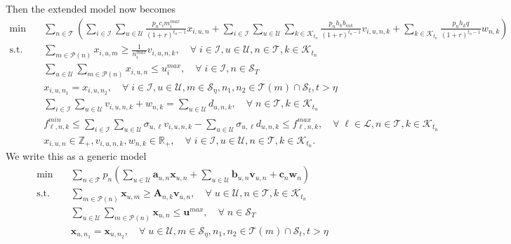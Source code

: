 \documentclass[10pt]{article}
\theoremstyle{plain}
\theoremstyle{definition}
\theoremstyle{remark}
\newcommand{\mb}{\mathbf}
\newcommand{\mcal}{\mathcal}
\newcommand{\bA}{\mathbf{A}}
\newcommand{\ba}{\mathbf{a}}
\newcommand{\bb}{\mathbf{b}}
\newcommand{\bx}{\mathbf{x}}
\newcommand{\cP}{\mathcal{P}}
\newcommand{\cS}{\mcal{S}}
\newcommand{\T}{\mathcal{T}}
\newcommand{\Z}{\mathbb{Z}}
\newcommand{\R}{\mathbb{R}}
\begin{document}
\begin{enumerate}[label=\emph{\roman*)}, topsep=0ex, itemsep=0ex]
Then the extended model now becomes 
\begin{subequations}
\begin{align}
\min \quad & \sum_{n\in \T}\left(\sum_{i\in \mcal{I}}\sum_{u\in \mcal{U}}\frac{p_nc_im_i^{max}}{(1+r)^{t_n-1}}x_{i,u,n}
	+\sum_{i\in \mcal{I}} \sum_{u\in \mcal{U}}\sum_{k\in \mcal{K}_{t_n}}\frac{p_nh_kb_{ink}}{(1+r)^{t_n-1}}v_{i,u,n,k} 
	+ \sum_{k\in \mcal{K}_{t_n}}\frac{p_nh_k q}{(1+r)^{t_n-1}}w_{n,k}\right)\label{ge2:obj}\\
\text{s.t.} \quad & \sum_{m\in \cP(n)}x_{i,u,m} \ge \frac{1}{n_i^{max}}v_{i,u,n,k},
\quad \forall\; i\in \mcal{I}, u\in \mcal{U}, n\in \T, k\in \mcal{K}_{t_n}\label{ge2:capacity}\\
& \sum_{u\in \mcal{U}}\sum_{m\in \cP(n)}x_{i,u,n} \le u_i^{max}, \quad \forall\; i\in \mcal{I}, n\in \cS_T\label{ge2:ub}\\
& x_{i,u,n_1} = x_{i,u,n_2}, \quad \forall\; i\in \mcal{I}, u\in \mcal{U}, m\in \mcal{S}_{\eta}, n_1, n_2\in \T(m)\cap \mcal{S}_t,t>\eta\label{ge2:na}\\
& \sum_{i\in \mcal{I}} \sum_{u\in \mcal{U}}v_{i,u,n,k} + w_{n,k} = \sum_{u\in \mcal{U}}d_{u,n,k}, \quad \forall\; n\in \T, k\in \mcal{K}_{t_n}\label{ge2:demand}\\
& f_{\ell,n,k}^{min} \le \sum_{i\in \mcal{I}}\sum_{u\in \mcal{U}}\sigma_{u,\ell}v_{i,u,n,k} - \sum_{u\in \mcal{U}}\sigma_{u,\ell}d_{u,n,k} \le f_{\ell,n,k}^{max},
\quad \forall\; \ell\in \mcal{L}, n\in \T, k\in \mcal{K}_{t_n}\label{ge2:transmission}\\
& x_{i,u,n}\in \Z_+, v_{i,u,n,k}, w_{n,k}\in \R_+, \quad \forall\; i\in \mcal{I}, u\in \mcal{U}, n\in \T, k\in \mcal{K}_{t_n}.\label{ge2:variable}
\end{align}
\end{subequations}
%
We write this as a generic model
%
\begin{subequations}
\begin{align}
\min \quad & \sum_{n\in \T}p_n\left(\sum_{u\in \mcal{U}}\ba_{u,n}\bx_{u,n} +\sum_{u\in \mcal{U}}\bb_{u,n}\mb{v}_{u,n} 
	+ \mb{c}_n \mb{w}_n\right)\label{hb2:obj}\\
\text{s.t.} \quad & \sum_{m\in \cP(n)}\bx_{u,m} \ge \bA_{n,k}\mb{v}_{u,n},
\quad \forall\; u\in \mcal{U}, n\in \T, k\in \mcal{K}_{t_n}\label{hb2:capacity}\\
& \sum_{u\in \mcal{U}}\sum_{m\in \cP(n)}\bx_{u,n} \le \mb{u}^{max}, \quad \forall\; n\in \cS_T\label{hb2:ub}\\
& \bx_{u,n_1} = \bx_{u,n_2}, \quad \forall\; u\in \mcal{U}, m\in \mcal{S}_{\eta}, n_1, n_2\in \T(m)\cap \mcal{S}_t,t>\eta\label{hb2:na}\\

\end{align}
\end{subequations}
\end{enumerate}
\end{document}
